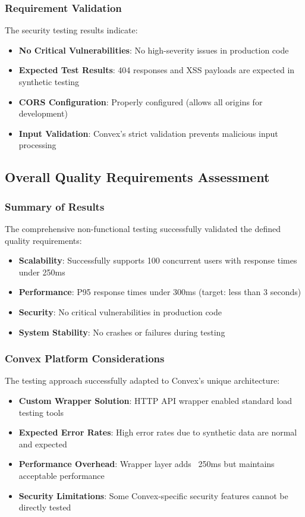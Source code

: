 \documentclass[12pt]{article}
\begin{document}
\subsubsection{Requirement Validation}
The security testing results indicate:
\begin{itemize}
    \item \textbf{No Critical Vulnerabilities}: No high-severity issues in production code
    \item \textbf{Expected Test Results}: 404 responses and XSS payloads are expected in synthetic testing
    \item \textbf{CORS Configuration}: Properly configured (allows all origins for development)
    \item \textbf{Input Validation}: Convex's strict validation prevents malicious input processing
\end{itemize}

\subsection{Overall Quality Requirements Assessment}

\subsubsection{Summary of Results}
The comprehensive non-functional testing successfully validated the defined quality requirements:

\begin{itemize}
    \item \textbf{Scalability}: Successfully supports 100 concurrent users with response times under 250ms
    \item \textbf{Performance}: P95 response times under 300ms (target: less than 3 seconds)
    \item \textbf{Security}: No critical vulnerabilities in production code
    \item \textbf{System Stability}: No crashes or failures during testing
\end{itemize}

\subsubsection{Convex Platform Considerations}
The testing approach successfully adapted to Convex's unique architecture:
\begin{itemize}
    \item \textbf{Custom Wrapper Solution}: HTTP API wrapper enabled standard load testing tools
    \item \textbf{Expected Error Rates}: High error rates due to synthetic data are normal and expected
    \item \textbf{Performance Overhead}: Wrapper layer adds ~250ms but maintains acceptable performance
    \item \textbf{Security Limitations}: Some Convex-specific security features cannot be directly tested
\end{itemize}
\end{document}
